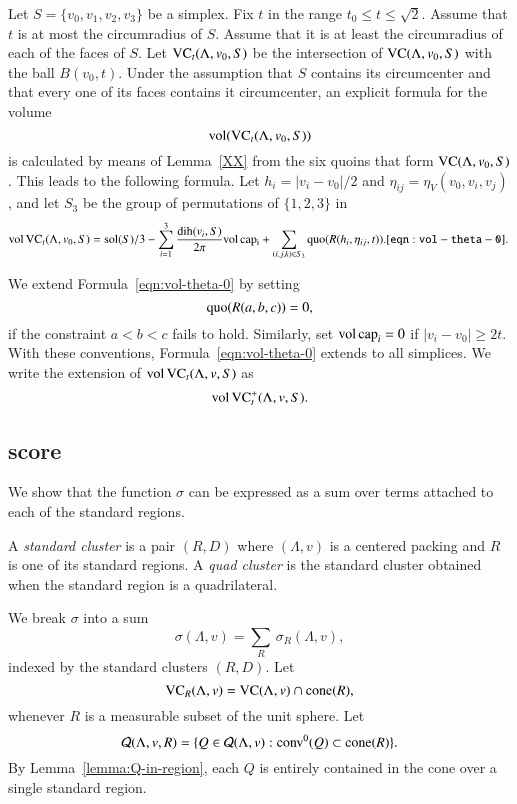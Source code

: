  Let $S=\{v_0,v_1,v_2,v_3\}$ be a simplex. Fix $t$ in the range
$t_0\le t\le\sqrt2$.  Assume that $t$ is at most the circumradius
of $S$. Assume that it is at least the circumradius of each of the
faces of $S$.  Let ${\operatorname{VC}}_t(\Lambda,v_0,S)$ be the intersection of
${\operatorname{VC}}(\Lambda,v_0,S)$ with the ball $B(v_0,t)$. Under the assumption
that $S$ contains its circumcenter and that every one of its faces
contains it circumcenter, an explicit formula for the volume
$${\operatorname{vol}}({\operatorname{VC}}_t(\Lambda,v_0,S))$$ is calculated by means of
Lemma~\ref{XX} from the six quoins that form ${\operatorname{VC}}(\Lambda,v_0,S)$.
This leads to the
following formula. Let $h_i = |v_i-v_0|/2$ and
$\eta_{ij}=\eta_V(v_0,v_i,v_j)$, and let $S_3$ be the group of
permutations of $\{1,2,3\}$ in
\begin{equation}
   \op{vol}\,\op{VC}_t(\Lambda,v_0,S) =
   \sol(S)/3 - \sum_{i=1}^3 \frac{\dih(v_i,S)}{2\pi}\op{vol}\,\op{cap_i}
   +\sum_{(i,j,k)\in S_3} \quo(R(h_i,\eta_{ij},t)).
   \tlabel{eqn:vol-theta-0}
\end{equation}


We extend Formula~\ref{eqn:vol-theta-0} by setting
    $$\operatorname{quo}(R(a,b,c)) = 0,$$
if the constraint $a < b < c$ fails to hold.  Similarly, set
${\operatorname{vol}}\,{\operatorname{cap}}_i=0$ if $|v_i-v_0|\ge 2t$.  With these
conventions,  Formula~\ref{eqn:vol-theta-0} extends to all
simplices.  We write the extension of ${\operatorname{vol}}\,{\operatorname{VC}}_t(\Lambda,v,S)$
as
$${\operatorname{vol}}\,{{\operatorname{VC}}^+_t}(\Lambda,v,S).$$


\subsection{score}

We show that the function $\sigma$ can be expressed as a sum over
terms attached to each of the standard regions.

\begin{definition} 
A {\it standard cluster\/} is a pair $(R,D)$ where $(\Lambda,v)$ is a
centered packing and $R$ is one of its standard regions.  A {\it
quad cluster\/} is the standard cluster obtained when the standard
region is a quadrilateral.
\end{definition}
%


We break $\sigma$ into a sum
   \begin{equation}
   \sigma(\Lambda,v) = \sum_R\,\sigma_R(\Lambda,v),
   \end{equation}
indexed by the standard clusters $(R,D)$.  Let
   $$
   {\operatorname{VC}}_R(\Lambda,v) = {\operatorname{VC}}(\Lambda,v)\cap {\operatorname{cone}}(R),
   $$
whenever $R$ is a measurable subset of the unit sphere.  Let
   $$
   {\mathcal Q}(\Lambda,v,R) = \{Q\in {\mathcal Q}(\Lambda,v) : {\operatorname{conv}}^0(Q)\subset {\operatorname{cone}}(R)\}.
   $$
By Lemma~\ref{lemma:Q-in-region},
 each $Q$ is entirely contained in the cone over a single
standard region.

